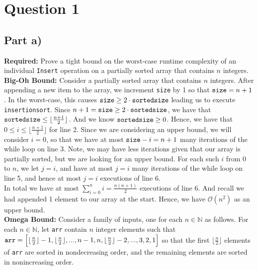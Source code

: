 \documentclass[12pt]{article}
\newcommand{\N}{\mathbb{N}}
\begin{document}

\setlength\parindent{0pt}

\section*{Question 1}

\subsection*{Part a)}

\textbf{Required:} Prove a tight bound on the worst-case runtime complexity of an individual \verb|Insert| operation on a partially sorted array that contains $n$ integers. \\

\textbf{Big-Oh Bound:} Consider a partially sorted array that contains $n$ integers. After appending a new item to the array, we increment \verb|size| by 1 so that $\verb|size| = n+1$. In the worst-case, this causes $\verb|size| \geq 2 \cdot \verb|sortedsize|$ leading us to execute \verb|insertionsort|. Since $n + 1 = \verb|size| \geq 2 \cdot \verb|sortedsize|$, we have that $\verb|sortedsize| \leq \lfloor \frac{n+1}{2} \rfloor$. And we know $\verb|sortedsize| \geq 0$. Hence, we have that $0 \leq i \leq \lfloor \frac{n+1}{2} \rfloor$ for line 2. Since we are considering an upper bound, we will consider $i = 0$, so that we have at most $\verb|size| - i = n + 1$ many iterations of the while loop on line 3. Note, we may have less iterations given that our array is partially sorted, but we are looking for an upper bound. For each such $i$ from 0 to $n$, we let $j = i$, and have at most $j=i$ many iterations of the while loop on line 5, and hence at most $j=i$ executions of line 6. \\

In total we have at most $\sum_{i=0}^n i = \frac{n(n+1)}{2}$ executions of line 6. And recall we had appended 1 element to our array at the start. Hence, we have $\mathcal{O}(n^2)$ as an upper bound. \\

\textbf{Omega Bound:} Consider a family of inputs, one for each $n \in \N$ as follows. For each $n \in \N$, let \verb|arr| contain $n$ integer elements such that $\verb|arr| = \Big[\lfloor \frac{n}{2} \rfloor-1, \lfloor \frac{n}{2} \rfloor,...,n-1,n, \lfloor \frac{n}{2} \rfloor-2,...,3,2,1 \Big]$ so that the first $\lfloor \frac{n}{2} \rfloor$ elements of \verb|arr| are sorted in nondecreasing order, and the remaining elements are sorted in nonincreasing order. \\
\end{document}
